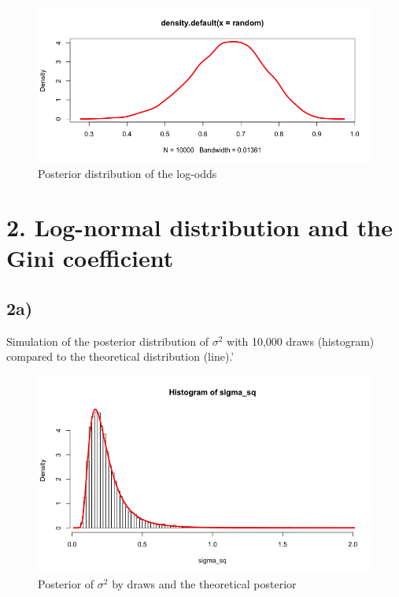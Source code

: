 \documentclass[]{article}
\begin{document}
\begin{figure}
\centering
\includegraphics{assets/lab_1_1_c.png}
\caption{Posterior distribution of the log-odds}
\end{figure}

\newpage

\section{2. Log-normal distribution and the Gini
coefficient}\label{log-normal-distribution-and-the-gini-coefficient}

\subsection{2a)}\label{a-1}

Simulation of the posterior distribution of \(\sigma^{2}\) with 10,000
draws (histogram) compared to the theoretical distribution (line).'

\begin{figure}
\centering
\includegraphics{assets/lab_1_2_a.png}
\caption{Posterior of \(\sigma^{2}\) by draws and the theoretical
posterior}
\end{figure}
\end{document}

